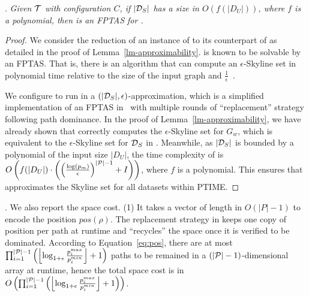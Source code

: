 . 
{\em Given $\T$ with configuration $C$, 
if $|\D_S|$ has a size in $O(f(|D_U|))$, 
where $f$ is a polynomial, 
then \apxmodis is an FPTAS for \modis. }

\begin{proof} We consider the reduction 
of an instance of \modis to its counterpart 
of \mos as detailed in the proof of Lemma~\ref{lm-approximability}.
\mos is known to be solvable by an FPTAS. That is, 
there is an algorithm that can compute an $\epsilon$-Skyline set in polynomial time relative to the size of the input graph 
and $\frac{1}{\epsilon}$~\cite{tsaggouris2009multiobjective}. 

We configure \apxmodis to run in  
a $(|\D_S|, \epsilon)$-approximation, 
which is a simplified implementation of an  
FPTAS in~\cite{tsaggouris2009multiobjective} with multiple 
rounds of ``replacement'' 
strategy following path dominance. 
In the proof of Lemma~\ref{lm-approximability}, we have already shown that \apxmodis correctly computes the $\epsilon$-Skyline set for $G_w$,  which is equivalent to the $\epsilon$-Skyline set for $\D_S$ in \modis.
Meanwhile, as $|\D_S|$ is bounded by a polynomial of  
the input size $|D_U|$, 
the time complexity of \apxmodis is $O\left(f(|D_U|)\cdot \left(\left(\frac{\log(p_m)}{\epsilon}\right)^{|\P|-1}+I\right)\right)$, where 
$f$ is a polynomial. This ensures that \apxmodis approximates the Skyline set for all datasets within PTIME.
\end{proof}

. 
We also report the space cost. 
(1) It takes a vector of length in $O(|P|-1)$ to encode the 
position $pos(\rho)$. The replacement strategy 
in \apxmodis keeps one copy of position per path at runtime and 
``recycles'' the space once it is verified to be dominated. 
According to Equation~\ref{eq:pos}, there 
are at most $\prod_{i=1}^{|\P|-1}\left(\left\lfloor\log _{1+\epsilon}\frac{p^{max}_i}{p^{min}_i}\right\rfloor+1\right)$ paths to be remained 
in a $(|\P|-1)$-dimensional array 
at runtime, 
hence the total space cost is in 
$O\left(\prod_{i=1}^{|\P|-1}\left(\left\lfloor\log _{1+\epsilon}\frac{p^{max}_i}{p^{min}_i}\right\rfloor+1\right)\right)$. 




